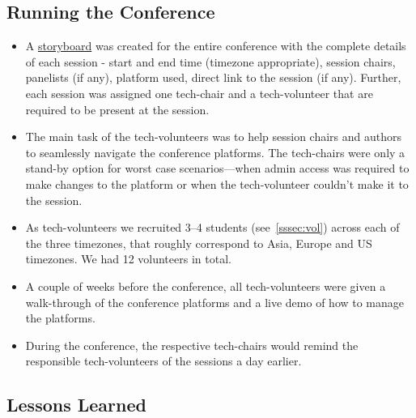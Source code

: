 \documentclass[%
10pt,								%
titlepage,						%
]
{scrartcl}
\begin{document}
    \subsection{Running the Conference}

        \begin{itemize}
            \item A \href{https://docs.google.com/spreadsheets/d/1ENeS3DyxSxWQGRSsiMsHuddwmdlg6r_4tH6VTcvLgMg/edit?usp=sharing}{storyboard} was created for the entire conference with the complete details of each session - start and end time (timezone appropriate), session chairs, panelists (if any), platform used, direct link to the session (if any). Further, each session was assigned one tech-chair and a tech-volunteer that are required to be present at the session.
            \item The main task of the tech-volunteers was to help session chairs and authors to seamlessly navigate the conference platforms. The tech-chairs were only a stand-by option for worst case scenarios---when admin access was required to make changes to the platform or when the tech-volunteer couldn't make it to the session.
            \item As tech-volunteers we recruited 3--4 students (see~\ref{sssec:vol}) across each of the three timezones, that roughly correspond to Asia, Europe and US timezones. We had 12 volunteers in total.
            \item A couple of weeks before the conference, all tech-volunteers were given a walk-through of the conference platforms and a live demo of how to manage the platforms.
            \item During the conference, the respective tech-chairs would remind the responsible tech-volunteers of the sessions a day earlier. 
        \end{itemize}

    \subsection{Lessons Learned}
\end{document}
